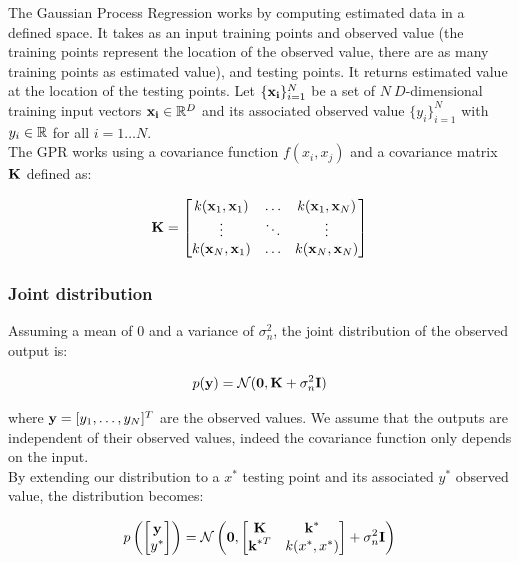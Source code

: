 The Gaussian Process Regression works by computing estimated data in a defined space. It takes as an input training points and observed value (the training points represent the location of the observed value, there are as many training points as estimated value), and testing points. It returns estimated value at the location of the testing points. Let 
$\{\boldsymbol{\mathbf{x_i}}\}_{i=1}^N$ be a set of $N\ D$-dimensional training input vectors $\boldsymbol{\mathbf{x_i}} \in \mathbb{R}^D$ and its associated observed value $\{y_i\}_{i=1}^N$ with $y_i \in \mathbb{R}$ for all $i=1\hdots N$.\\
The GPR works using a covariance function 
$f(x_i, x_j)$ and a covariance matrix $\boldsymbol{\mathbf{{K}}}$ defined as:

\begin{equation}
  \label{equ_covariancetrainingdata}
  \boldsymbol{\mathbf{{K}}} =
  \begin{bmatrix}
    k(\boldsymbol{\mathbf{x}}_1, \boldsymbol{\mathbf{x}}_1) & \hdots & k(\boldsymbol{\mathbf{x}}_1, \boldsymbol{\mathbf{x}}_N) \\ 
    \vdots & \ddots & \vdots \\ 
    k(\boldsymbol{\mathbf{x}}_N, \boldsymbol{\mathbf{x}}_1) & \hdots & k(\boldsymbol{\mathbf{x}}_N, \boldsymbol{\mathbf{x}}_N) \\ 
  \end{bmatrix}
\end{equation}

\subsubsection{Joint distribution}

Assuming a mean of 0 and a variance of $\sigma_n^2$, the joint distribution of the observed output is:

\begin{equation}
  \label{equ_probdist}
  p(\boldsymbol{\mathbf{y}}) = \mathcal{N}(\boldsymbol{\mathbf{0}}, \boldsymbol{\mathbf{{K}}} + \sigma_n^2 \boldsymbol{\mathbf{{I}}})
\end{equation}

where $\boldsymbol{\mathbf{y}} = [y_1,\hdots, y_N]^T$ are the observed values. We assume that the outputs are independent of their observed values, indeed the covariance function only depends on the input.\\

By extending our distribution to a $x^*$ testing point and its associated $y^*$ observed value, the distribution becomes:

\begin{equation}
  \label{equ_probdist2}
  p\left(
    \begin{bmatrix}
      \boldsymbol{\mathbf{y}} \\ y^*
    \end{bmatrix}
\right) = \mathcal{N}\left(\boldsymbol{\mathbf{0}},
\begin{bmatrix}
  \boldsymbol{\mathbf{{K}}} & \boldsymbol{\mathbf{k}}^* \\ \boldsymbol{\mathbf{k}}^{*T} & k(x^*, x^*)
\end{bmatrix}
+ \sigma_n^2 \boldsymbol{\mathbf{{I}}}\right)
\end{equation}

